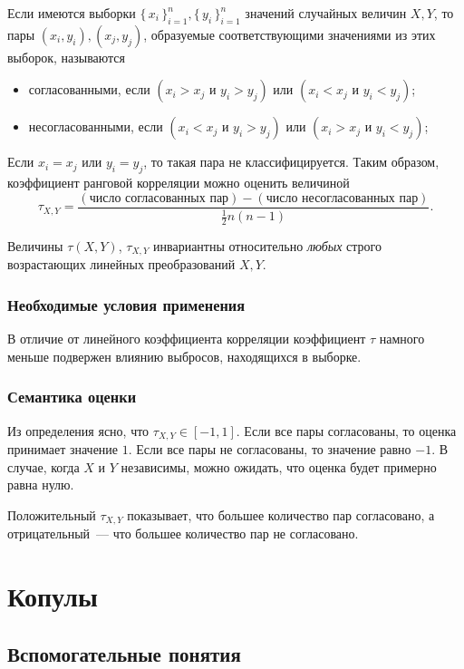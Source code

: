 Если имеются выборки $\{\, x_i \,\}_{i=1}^n, \{\, y_i \,\}_{i=1}^n$ значений случайных величин $X, Y$, то пары $(x_i, y_i), (x_j, y_j)$, образуемые соответствующими значениями из этих выборок, называются
\begin{itemize}
	\item согласованными, если $(x_i > x_j \text{ и } y_i > y_j) \text{ или } (x_i < x_j \text{ и } y_i < y_j)$;
	\item несогласованными, если $(x_i < x_j \text{ и } y_i > y_j) \text{ или } (x_i > x_j \text{ и } y_i < y_j)$;
\end{itemize}
Если $x_i = x_j \text{ или } y_i = y_j$, то такая пара не классифицируется. Таким образом, коэффициент ранговой корреляции можно оценить величиной
\begin{equation}
\tau_{X, Y} = \frac{(\text{число согласованных пар}) - (\text{число несогласованных пар})}{\frac{1}{2}n(n - 1)}.
\end{equation}

Величины $\tau(X, Y)$, $\tau_{X, Y}$ инвариантны относительно \emph{любых} строго возрастающих линейных преобразований $X, Y$.

\subsubsection*{Необходимые условия применения}
В отличие от линейного коэффициента корреляции коэффициент $\tau$ намного меньше подвержен влиянию выбросов, находящихся в выборке.
\subsubsection*{Семантика оценки}
Из определения ясно, что $\tau_{X, Y} \in [-1, 1]$. Если все пары согласованы, то оценка принимает значение $1$. Если все пары не согласованы, то значение равно $-1$. В случае, когда $X$ и $Y$ независимы, можно ожидать, что оценка будет примерно равна нулю.

Положительный $\tau_{X, Y}$ показывает, что большее количество пар согласовано, а отрицательный~--- что большее количество пар не согласовано.

\section*{Копулы}

\subsection*{Вспомогательные понятия}

